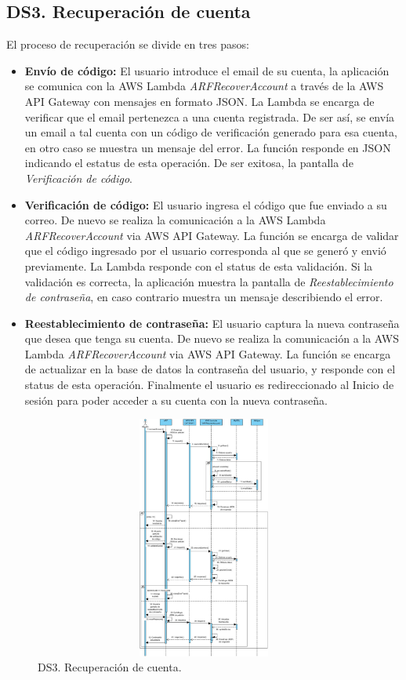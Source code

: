 \subsection{DS3. Recuperación de cuenta}
El proceso de recuperación se divide en tres pasos:
\begin{itemize}
	\item \textbf{Envío de código:} El usuario introduce el email de su cuenta, la aplicación se comunica con la AWS Lambda \textit{ARFRecoverAccount} a través de la AWS API Gateway con mensajes en formato JSON. La Lambda se encarga de verificar que el email pertenezca a una cuenta registrada. De ser así, se envía un email a tal cuenta con un código de verificación generado para esa cuenta, en otro caso se muestra un mensaje del error. La función responde en JSON indicando el estatus de esta operación. De ser exitosa, la pantalla de \textit{Verificación de código}.
	\item \textbf{Verificación de código:} El usuario ingresa el código que fue enviado a su correo. De nuevo se realiza la comunicación a la AWS Lambda \textit{ARFRecoverAccount} via AWS API Gateway. La función se encarga de validar que el código ingresado por el usuario corresponda al que se generó y envió previamente. La Lambda responde con el status de esta validación. Si la validación es correcta, la aplicación muestra la pantalla de \textit{Reestablecimiento de contraseña}, en caso contrario muestra un mensaje describiendo el error.
	\item \textbf{Reestablecimiento de contraseña:} El usuario captura la nueva contraseña que desea que tenga su cuenta. De nuevo se realiza la comunicación a la AWS Lambda \textit{ARFRecoverAccount} via AWS API Gateway. La función se encarga de actualizar en la base de datos la contraseña del usuario, y responde con el status de esta operación. Finalmente el usuario es redireccionado al Inicio de sesión para poder acceder a su cuenta con la nueva contraseña.
\end{itemize}

\begin{figure}[h!]
	\centering
	\includegraphics[width=14cm,height=8cm]{imagenes/analisis/ds/RecCuenta.jpg}
	\caption{DS3. Recuperación de cuenta.}
	\label{fig:dsreccuenta}
\end{figure}


